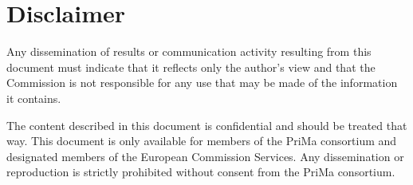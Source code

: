 \chapter{Disclaimer}
\label{sec:disclaimer}

Any dissemination of results or communication activity resulting from this
document must indicate that it reflects only the author's view and that the
Commission is not responsible for any use that may be made of the information
it contains.

The content described in this document is confidential and should be treated
that way. This document is only available for members of the PriMa consortium
and designated members of the European Commission Services. Any dissemination
or reproduction is strictly prohibited without consent from the PriMa
consortium.

